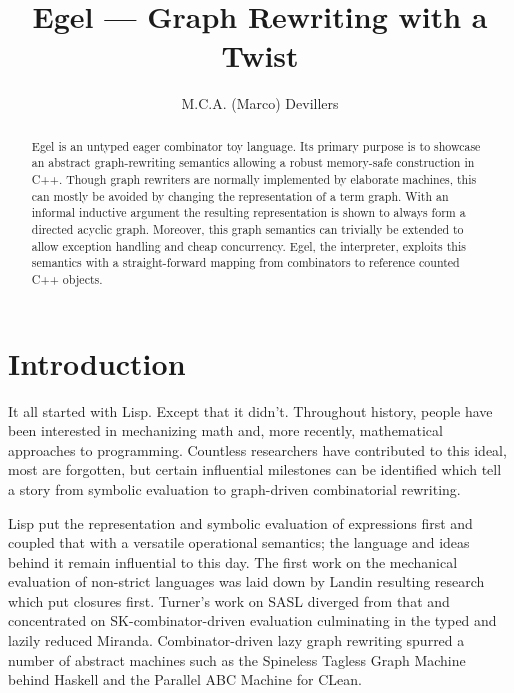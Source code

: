 \documentclass{research4cacm}
\begin{document}

\title{Egel --- Graph Rewriting with a Twist}
\author{
\alignauthor
M.C.A. (Marco) Devillers\\
}
\maketitle


\begin{abstract}
Egel is an untyped eager combinator toy language. Its primary purpose 
is to showcase an abstract graph-rewriting semantics allowing a
robust memory-safe construction in C++.
%
Though graph rewriters are normally implemented by elaborate
machines, this can mostly be avoided by changing the representation of 
a term graph. With an informal inductive argument the resulting 
representation is shown to always form a directed acyclic graph.
Moreover, this graph semantics can trivially be extended to allow
exception handling and cheap concurrency.
%
Egel, the interpreter, exploits this semantics with a straight-forward
mapping from combinators to reference counted C++ objects.
\end{abstract}


\section{Introduction}

It all started with Lisp. Except that it didn't. 
Throughout history, people have been interested in mechanizing math and,
more recently, mathematical approaches to programming. Countless
researchers have contributed to this ideal, most are forgotten, but
certain influential milestones can be identified which tell a
story from symbolic evaluation to graph-driven combinatorial
rewriting.

Lisp\cite{mccarthy:lisp1} put the representation and symbolic 
evaluation of expressions first and coupled that with a versatile 
operational semantics; 
the language and ideas behind it remain influential to this day.
The first work on the mechanical evaluation of non-strict languages was
laid down by Landin\cite{landin:secd} resulting research which put
closures first.
Turner's work on SASL\cite{turner:sasl} diverged from that and
concentrated on SK-combinator-driven evaluation culminating in
the typed and lazily reduced Miranda\cite{turner:miranda}.
Combinator-driven lazy graph rewriting spurred a number of 
abstract machines such as the Spineless Tagless Graph Machine\cite{spj:stgm}
behind Haskell and the Parallel ABC Machine\cite{plasmeijer:clean} for CLean.
\end{document}
